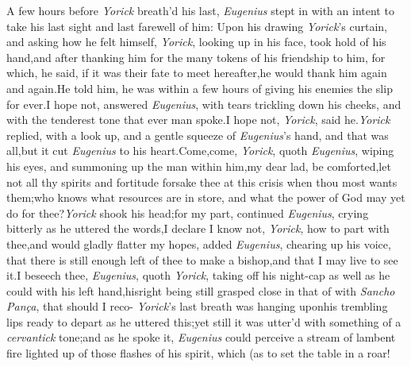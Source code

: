 \documentclass{article}
\begin{document}
A few hours before \textit{Yorick} breath’d\break
his last, \textit{Eugenius} stept in with an intent
to take his last sight and last farewell of 
him: Upon his drawing \textit{Yorick}’s curtain, 
and asking how he felt himself,
\textit{Yorick}, looking up in his face, took hold
of his hand,\tsk and after thanking him
for the many tokens of his friendship to him, for which, he said,
if it was their fate to meet hereafter,\tsk  he would thank him again and
again.\tsk  He told him, he was within a few hours of giving his enemies the
slip for ever.\tsk  I hope not, answered \textit{Eugenius}, with tears trickling
down his cheeks, and with the tenderest tone that ever man spoke.\tsk  I hope
not,\break
\textit{Yorick}, said he.\tsh  \textit{Yorick} replied, with a look
up, and a gentle squeeze of \textit{Eugenius}’s hand, and that was
all,\tsh  but it cut \textit{Eugenius} to his heart.\tsh Come,\tsh\break  come,
\textit{Yorick}, quoth \textit{Eugenius}, wiping his eyes, and summoning up the
man\break
within him,\tsk  my dear lad, be comfort\-ed,\tsk  let not all thy spirits and
fortitude forsake thee at this crisis when thou most wants
them;\tsh  who knows what resources are in store, and what the power of
God may yet do for thee?\tsh  \textit{Yorick}
shook his head;\tsk  for my part, continued \textit{Eugenius},
crying bitterly as he uttered the words,\tsk  I declare I know not,
\textit{Yorick}, how to part with thee,\tsh and\break 
would gladly flatter my hopes, added\break
\textit{Eugenius}, chearing up his voice, that\break
there is still enough left of thee to make\break
a bishop,\tsk and that I may live to see\break 
it.\tsk  I beseech thee, \textit{Eugenius}, quoth\break
\textit{Yorick}, taking off his night-cap as well as he
could with his left hand,\tsk  his\break right being still grasped close in that of
with \textit{Sancho Pança}, that should I reco-\break 
{}
\textit{Yorick}’s last breath was hanging upon\break his
trembling lips ready to depart as he uttered this;\tsh  yet still it
was utter’d with something of a \textit{cervantick} tone;\tsh\break and as he
spoke it, \textit{Eugenius} could perceive a stream of lambent fire lighted up
 of those flashes of his
spirit, which (as  to set the
table in a roar!
\end{document}

